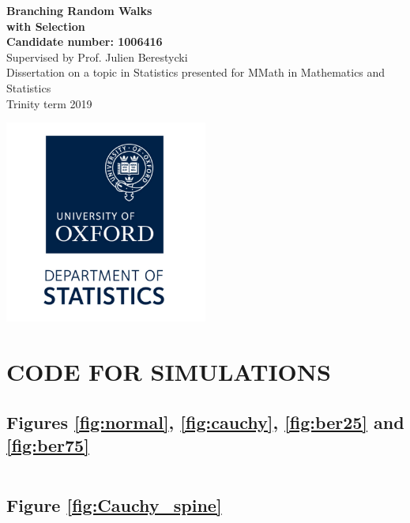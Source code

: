 \documentclass[12pt]{article}
\begin{document}
\begin{titlepage}
   \begin{center}
       \vspace*{1cm}
 
       \textbf{{\huge Branching Random Walks \\ with Selection}}
       \vspace{1.5cm} \\
       \textbf{Candidate number: 1006416}
       \vspace{0.5cm} \\
       Supervised by Prof. Julien Berestycki 
       \vspace{0.5cm} \\
       Dissertation on a topic in Statistics \linebreak presented for MMath in Mathematics and Statistics
       \vspace{0.3cm} \\
       Trinity term 2019
       \vfill
 
       \includegraphics[width=0.5\textwidth]{graphics/oxford_logo.png}
 
 
   \end{center}
\end{titlepage}

\tableofcontents
\newpage


\newpage







\section{CODE FOR SIMULATIONS}

\subsection{Figures \ref{fig:normal}, \ref{fig:cauchy}, \ref{fig:ber25} and \ref{fig:ber75}}
\inputminted[obeytabs=true,tabsize=2]{python}{simulations/simulation(for_show).py}

\subsection{Figure \ref{fig:Cauchy_spine}}
\inputminted[obeytabs=true,tabsize=2]{python}{simulations/PPP_simulation(for_show).py}
\newpage



\end{document}
